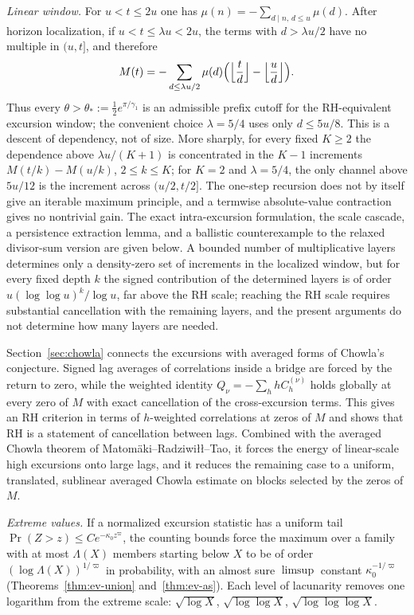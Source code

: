 \documentclass[11pt]{amsart}
\numberwithin{equation}{section}
\theoremstyle{plain}
\theoremstyle{definition}
\theoremstyle{remark}
\begin{document}
\smallskip\noindent\emph{Linear window.} For $u<t\le2u$ one has
$\mu(n)=-\sum_{d\mid n,\,d\le u}\mu(d)$.  After horizon localization,
if $u<t\le\lambda u<2u$, the terms with $d>\lambda u/2$ have no multiple
in $(u,t]$, and therefore
\[
M(t)=-\sum_{d\le\lambda u/2}\mu(d)
\Bigl(\Bigl\lfloor\frac td\Bigr\rfloor-\Bigl\lfloor\frac ud\Bigr\rfloor\Bigr).
\]
Thus every $\theta>\theta_*:=\frac12e^{\pi/\gamma_1}$ is an admissible
prefix cutoff for the RH-equivalent excursion window; the convenient choice
$\lambda=5/4$ uses only $d\le5u/8$.  This is a descent of dependency, not
of size.  More sharply, for every fixed $K\ge2$ the dependence above
$\lambda u/(K+1)$ is concentrated in the $K-1$ increments
$M(t/k)-M(u/k)$, $2\le k\le K$; for $K=2$ and $\lambda=5/4$, the only channel
above $5u/12$ is the increment across $(u/2,t/2]$.  The one-step recursion
does not by itself give an iterable maximum principle, and a termwise
absolute-value contraction gives no nontrivial gain.  The exact
intra-excursion formulation, the scale cascade, a persistence extraction
lemma, and a ballistic counterexample to the relaxed divisor-sum version are
given below. A bounded number of multiplicative layers determines only a
density-zero set of increments in the localized window, but for every fixed
depth $k$ the signed contribution of the determined layers is of order
$u(\log\log u)^k/\log u$, far above the RH scale; reaching the RH scale
requires substantial cancellation with the remaining layers, and the present
arguments do not determine how many layers are needed.

Section~\ref{sec:chowla} connects the excursions with averaged forms of
Chowla's conjecture. Signed lag averages of correlations inside a bridge are
forced by the return to zero, while the weighted identity
$Q_\nu=-\sum_hhC^{(\nu)}_h$ holds globally at every zero of $M$ with exact
cancellation of the cross-excursion terms. This gives an RH criterion in
terms of $h$-weighted correlations at zeros of $M$ and shows that RH is a
statement of cancellation between lags. Combined with the averaged Chowla
theorem of Matom\"aki--Radziwi\l\l--Tao, it forces the energy of
linear-scale high excursions onto large lags, and it reduces the remaining
case to a uniform, translated, sublinear averaged Chowla estimate on blocks
selected by the zeros of $M$.

\smallskip\noindent\emph{Extreme values.} If a normalized excursion statistic
has a uniform tail $\Pr(Z>z)\le Ce^{-\kappa_0z^\varpi}$, the counting bounds force the
maximum over a family with at most $\Lambda(X)$ members starting below $X$ to be
of order $(\log \Lambda(X))^{1/\varpi}$ in probability, with an almost sure $\limsup$ constant
$\kappa_0^{-1/\varpi}$ (Theorems~\ref{thm:ev-union} and~\ref{thm:ev-as}). Each level of
lacunarity removes one logarithm from the extreme scale:
$\sqrt{\log X}$, $\sqrt{\log\log X}$, $\sqrt{\log\log\log X}$.
\end{document}
